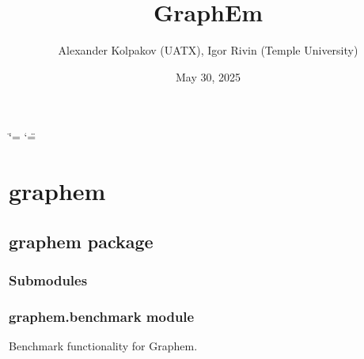 \documentclass[letterpaper,10pt,english]{sphinxmanual}
\title{GraphEm}
\date{May 30, 2025}
\author{Alexander Kolpakov (UATX), Igor Rivin (Temple University)}
\begin{document}
\ifdefined\shorthandoff
  \ifnum\catcode`\=\string=\active\shorthandoff{=}\fi
  \ifnum\catcode`\"=\active{}\fi
\fi

\pagestyle{empty}
\sphinxmaketitle
\pagestyle{plain}
\sphinxtableofcontents
\pagestyle{normal}
\label{\detokenize{index::doc}}


\sphinxstepscope


\chapter{graphem}
\label{\detokenize{modules:graphem}}\label{\detokenize{modules::doc}}
\sphinxstepscope


\section{graphem package}
\label{\detokenize{graphem:graphem-package}}\label{\detokenize{graphem::doc}}

\subsection{Submodules}
\label{\detokenize{graphem:submodules}}

\subsection{graphem.benchmark module}
\label{\detokenize{graphem:module-graphem.benchmark}}\label{\detokenize{graphem:graphem-benchmark-module}}
\sphinxAtStartPar
Benchmark functionality for Graphem.
\end{document}

